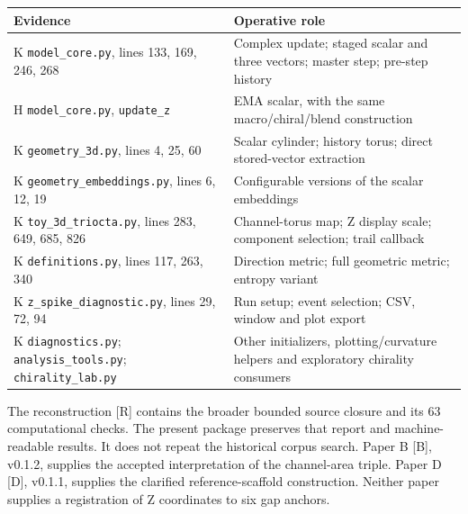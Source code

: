 \documentclass[
  11pt,
  a4paper,
]{article}
\newcounter{none} %
\begin{document}
{\def\LTcaptype{none} %
\begin{longtable}[]{@{}
  >{\raggedright\arraybackslash}p{}
  >{\raggedright\arraybackslash}p{}@{}}
\toprule\noalign{}
\begin{minipage}[b]{\linewidth}\raggedright
Evidence
\end{minipage} & \begin{minipage}[b]{\linewidth}\raggedright
Operative role
\end{minipage} \\
\midrule\noalign{}
\endhead
\bottomrule\noalign{}
\endlastfoot
K \texttt{model\_core.py}, lines 133, 169, 246, 268 & Complex update; staged scalar and three vectors; master step; pre-step history \\
H \texttt{model\_core.py}, \texttt{update\_z} & EMA scalar, with the same macro/chiral/blend construction \\
K \texttt{geometry\_3d.py}, lines 4, 25, 60 & Scalar cylinder; history torus; direct stored-vector extraction \\
K \texttt{geometry\_embeddings.py}, lines 6, 12, 19 & Configurable versions of the scalar embeddings \\
K \texttt{toy\_3d\_triocta.py}, lines 283, 649, 685, 826 & Channel-torus map; Z display scale; component selection; trail callback \\
K \texttt{definitions.py}, lines 117, 263, 340 & Direction metric; full geometric metric; entropy variant \\
K \texttt{z\_spike\_diagnostic.py}, lines 29, 72, 94 & Run setup; event selection; CSV, window and plot export \\
K \texttt{diagnostics.py}; \texttt{analysis\_tools.py}; \texttt{chirality\_lab.py} & Other initializers, plotting/curvature helpers and exploratory chirality consumers \\
\end{longtable}
}

The reconstruction {[}R{]} contains the broader bounded source closure and its 63 computational checks. The present package preserves that report and machine-readable results. It does not repeat the historical corpus search. Paper B {[}B{]}, v0.1.2, supplies the accepted interpretation of the channel-area triple. Paper D {[}D{]}, v0.1.1, supplies the clarified reference-scaffold construction. Neither paper supplies a registration of Z coordinates to six gap anchors.
\end{document}
